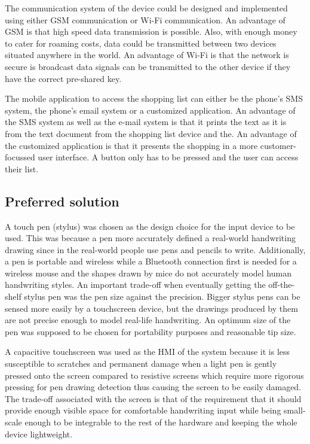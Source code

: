 The communication system of the device could be designed and implemented using either GSM communication or Wi-Fi communication. An advantage of GSM is that high speed data transmission is possible. Also, with enough money to cater for roaming costs, data could be transmitted between two devices situated anywhere in the world. An advantage of Wi-Fi is that the network is secure is broadcast data signals can be transmitted to the other device if they have the correct pre-shared key. 

The mobile application to access the shopping list can either be the phone’s SMS system, the phone’s email system or a customized application. An advantage of the SMS system as well as the e-mail system is that it prints the text as it is from the text document from the shopping list device and the. An advantage of the customized application is that it presents the shopping in a more customer-focussed user interface. A button only has to be pressed and the user can access their list.

\subsection{Preferred solution}

A touch pen (stylus) was chosen as the design choice for the input device to be used. This was because a pen more accurately defined a real-world handwriting drawing since in the real-world people use pens and pencils to write. Additionally, a pen is portable and wireless while a Bluetooth connection first is needed for a wireless mouse and the shapes drawn by mice do not accurately model human handwriting styles. An important trade-off when eventually getting the off-the-shelf stylus pen was the pen size against the precision. Bigger stylus pens can be sensed more easily by a touchscreen device, but the drawings produced by them are not precise enough to model real-life handwriting. An optimum size of the pen was supposed to be chosen for portability purposes and reasonable tip size.

A capacitive touchscreen was used as the HMI of the system because it is less susceptible to scratches and permanent damage when a light pen is gently pressed onto the screen compared to resistive screens which require more rigorous pressing for pen drawing detection thus causing the screen to be easily damaged. The trade-off associated with the screen is that of the requirement that it should provide enough visible space for comfortable handwriting input while being small-scale enough to be integrable to the rest of the hardware and keeping the whole device lightweight.

